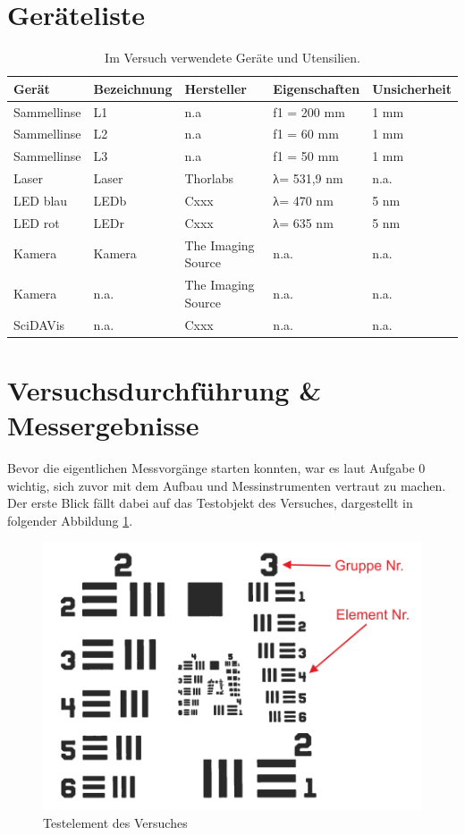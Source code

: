 \documentclass[12pt,a4paper,twoside]{article}
\begin{document}
\section{Geräteliste} %

    \begin{table}[H]
        \centering
        \caption{Im Versuch verwendete Geräte und Utensilien.}
        \label{tab:geraete}
        \begin{tabular}{| l | l | l | l | l |}
            \hline
            Gerät   & Bezeichnung  & Hersteller  & Eigenschaften  & Unsicherheit \\
            \hline
            Sammellinse & L1 & {n.a} & f1 = 200 mm & 1 mm \\
            Sammellinse & L2 & {n.a} & f1 = 60 mm  & 1 mm \\
            Sammellinse & L3 & {n.a} & f1 = 50 mm  & 1 mm \\
            Laser & Laser & Thorlabs & λ= 531,9 nm & {n.a.} \\
            LED blau & LEDb & Cxxx & λ= 470 nm & 5 nm \\
            LED rot & LEDr & Cxxx & λ= 635 nm & 5 nm \\
            Kamera & Kamera & The Imaging Source & {n.a.} & {n.a.}\\
            Kamera & {n.a.} & The Imaging Source & {n.a.} & {n.a.}\\
            SciDAVis & {n.a.} & Cxxx & {n.a.} & {n.a.} \\
            \hline
        \end{tabular}
    \end{table}


\section{Versuchsdurchführung \& Messergebnisse} %

Bevor die eigentlichen Messvorgänge starten konnten, war es laut Aufgabe 0 wichtig, sich zuvor mit dem Aufbau und Messinstrumenten vertraut zu machen. 
Der erste Blick fällt dabei auf das Testobjekt des Versuches, dargestellt in folgender Abbildung \ref{fig:Testelement}.

\begin{figure}[H]
    \centering
    \includegraphics[width=0.6\linewidth]{nudes/Testelement.png}
    \caption{Testelement des Versuches \cite{teachcenter2}}
    \label{fig:Testelement}
\end{figure}
\end{document}
